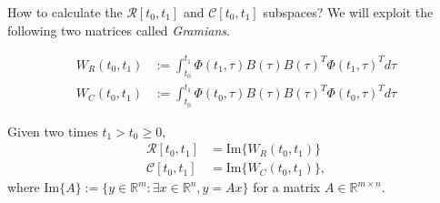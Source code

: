 How to calculate the $\mathcal{R}[t_0,t_1]$ and $\mathcal{C}[t_0,t_1]$ subspaces? We will exploit the following two matrices called \emph{Gramians}.

\begin{definition}
	\begin{align}
		W_R(t_0,t_1) &:= \int_{t_0}^{t_1} \Phi(t_1,\tau)B(\tau)B(\tau)^T\Phi(t_1,\tau)^Td\tau \\
		W_C(t_0,t_1) &:= \int_{t_0}^{t_1} \Phi(t_0,\tau)B(\tau)B(\tau)^T\Phi(t_0,\tau)^Td\tau 
	\end{align}
\end{definition}

\begin{theorem}
Given two times $t_1 > t_0 \geq 0$,
	\begin{align}
		\mathcal{R}[t_0,t_1] &= \text{Im}\{W_R(t_0,t_1)\} \label{RI} \\
		\mathcal{C}[t_0,t_1] &= \text{Im}\{W_C(t_0,t_1)\} \label{CI},
	\end{align}
	where $\text{Im}\{A\}:= \Big\{y\in\mathbb{R}^m: \exists x\in\mathbb{R}^n, y = Ax\Big\}$ for a matrix $A\in\mathbb{R}^{m\times n}$.
\end{theorem}
